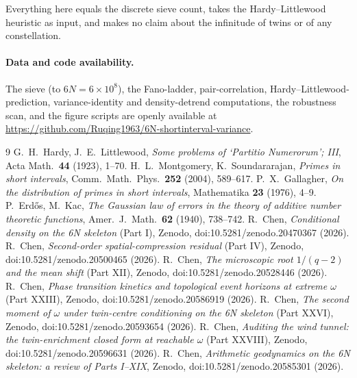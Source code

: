 \documentclass[11pt]{article}
\theoremstyle{definition}
\begin{document}
Everything here equals the discrete sieve count, takes the Hardy--Littlewood heuristic as input, and
makes no claim about the infinitude of twins or of any constellation.

\paragraph{Data and code availability.} The sieve (to $6N=6\times10^{8}$), the Fano-ladder, pair-cor\-relation,
Hardy--Littlewood-prediction, variance-identity and density-detrend computations, the robustness scan,
and the figure scripts are openly available at
\url{https://github.com/Ruqing1963/6N-shortinterval-variance}.

\begin{thebibliography}{9}
 G.~H.~Hardy, J.~E.~Littlewood, \emph{Some problems of `Partitio Numerorum'; III}, Acta Math.\ \textbf{44} (1923), 1--70.
 H.~L.~Montgomery, K.~Soundararajan, \emph{Primes in short intervals}, Comm.\ Math.\ Phys.\ \textbf{252} (2004), 589--617.
 P.~X.~Gallagher, \emph{On the distribution of primes in short intervals}, Mathematika \textbf{23} (1976), 4--9.
 P.~Erd\H{o}s, M.~Kac, \emph{The Gaussian law of errors in the theory of additive number theoretic functions}, Amer.\ J.\ Math.\ \textbf{62} (1940), 738--742.
 R.~Chen, \emph{Conditional density on the 6N skeleton} (Part I), Zenodo, doi:10.5281/zenodo.20470367 (2026).
 R.~Chen, \emph{Second-order spatial-compression residual} (Part IV), Zenodo, doi:10.5281/zenodo.20500465 (2026).
 R.~Chen, \emph{The microscopic root $1/(q-2)$ and the mean shift} (Part XII), Zenodo, doi:10.5281/zenodo.20528446 (2026).
 R.~Chen, \emph{Phase transition kinetics and topological event horizons at extreme $\omega$} (Part XXIII), Zenodo, doi:10.5281/zenodo.20586919 (2026).
 R.~Chen, \emph{The second moment of $\omega$ under twin-centre conditioning on the 6N skeleton} (Part XXVI), Zenodo, doi:10.5281/zenodo.20593654 (2026).
 R.~Chen, \emph{Auditing the wind tunnel: the twin-enrichment closed form at reachable $\omega$} (Part XXVIII), Zenodo, doi:10.5281/zenodo.20596631 (2026).
 R.~Chen, \emph{Arithmetic geodynamics on the 6N skeleton: a review of Parts I--XIX}, Zenodo, doi:10.5281/zenodo.20585301 (2026).
\end{thebibliography}
\end{document}
